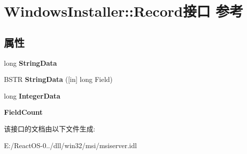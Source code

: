 \hypertarget{interface_windows_installer_1_1_record}{}\section{Windows\+Installer\+:\+:Record接口 参考}
\label{interface_windows_installer_1_1_record}
\subsection*{属性}
\begin{DoxyCompactItemize}
\item 
\mbox{\label{interface_windows_installer_1_1_record_a0f9185287f45822633dfca70c5e1a08b}} 
long {\bfseries String\+Data}
\item 
\mbox{\label{interface_windows_installer_1_1_record_ae20a0bff9946f838aee978df94b51a4b}} 
B\+S\+TR {\bfseries String\+Data} (\mbox{[}in\mbox{]} long Field)
\item 
\mbox{\label{interface_windows_installer_1_1_record_ac49831c6f76a37a04265ba7e05c1bb6b}} 
long {\bfseries Integer\+Data}
\item 
\mbox{\label{interface_windows_installer_1_1_record_ae87b9e796407dce605938fbf21cf7295}} 
{\bfseries Field\+Count}
\end{DoxyCompactItemize}


该接口的文档由以下文件生成\+:\begin{DoxyCompactItemize}
\item 
E\+:/\+React\+O\+S-\/0../dll/win32/msi/msiserver.\+idl\end{DoxyCompactItemize}
